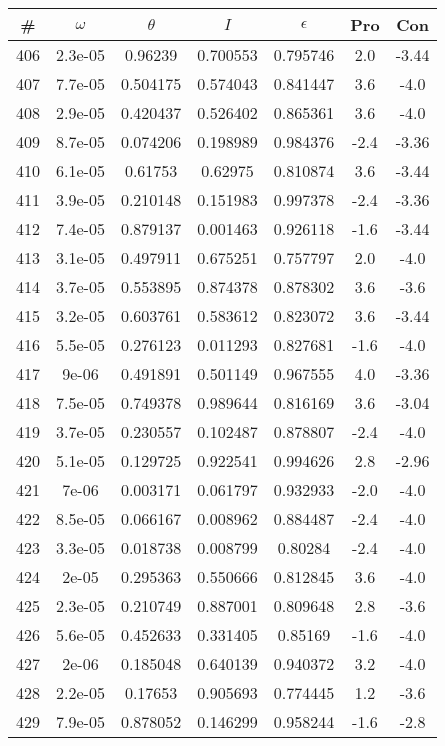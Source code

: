 \begin{table}
\begin{tabular}{c|c|c|c|c|c|c}
\# & $\omega$ & $\theta$ & $I$ & $\epsilon$ & Pro & Con\\
\hline
406 & 2.3e-05 & 0.96239 & 0.700553 & 0.795746 & 2.0 & -3.44\\
407 & 7.7e-05 & 0.504175 & 0.574043 & 0.841447 & 3.6 & -4.0\\
408 & 2.9e-05 & 0.420437 & 0.526402 & 0.865361 & 3.6 & -4.0\\
409 & 8.7e-05 & 0.074206 & 0.198989 & 0.984376 & -2.4 & -3.36\\
410 & 6.1e-05 & 0.61753 & 0.62975 & 0.810874 & 3.6 & -3.44\\
411 & 3.9e-05 & 0.210148 & 0.151983 & 0.997378 & -2.4 & -3.36\\
412 & 7.4e-05 & 0.879137 & 0.001463 & 0.926118 & -1.6 & -3.44\\
413 & 3.1e-05 & 0.497911 & 0.675251 & 0.757797 & 2.0 & -4.0\\
414 & 3.7e-05 & 0.553895 & 0.874378 & 0.878302 & 3.6 & -3.6\\
415 & 3.2e-05 & 0.603761 & 0.583612 & 0.823072 & 3.6 & -3.44\\
416 & 5.5e-05 & 0.276123 & 0.011293 & 0.827681 & -1.6 & -4.0\\
417 & 9e-06 & 0.491891 & 0.501149 & 0.967555 & 4.0 & -3.36\\
418 & 7.5e-05 & 0.749378 & 0.989644 & 0.816169 & 3.6 & -3.04\\
419 & 3.7e-05 & 0.230557 & 0.102487 & 0.878807 & -2.4 & -4.0\\
420 & 5.1e-05 & 0.129725 & 0.922541 & 0.994626 & 2.8 & -2.96\\
421 & 7e-06 & 0.003171 & 0.061797 & 0.932933 & -2.0 & -4.0\\
422 & 8.5e-05 & 0.066167 & 0.008962 & 0.884487 & -2.4 & -4.0\\
423 & 3.3e-05 & 0.018738 & 0.008799 & 0.80284 & -2.4 & -4.0\\
424 & 2e-05 & 0.295363 & 0.550666 & 0.812845 & 3.6 & -4.0\\
425 & 2.3e-05 & 0.210749 & 0.887001 & 0.809648 & 2.8 & -3.6\\
426 & 5.6e-05 & 0.452633 & 0.331405 & 0.85169 & -1.6 & -4.0\\
427 & 2e-06 & 0.185048 & 0.640139 & 0.940372 & 3.2 & -4.0\\
428 & 2.2e-05 & 0.17653 & 0.905693 & 0.774445 & 1.2 & -3.6\\
429 & 7.9e-05 & 0.878052 & 0.146299 & 0.958244 & -1.6 & -2.8\\

\end{tabular}
\end{table}
